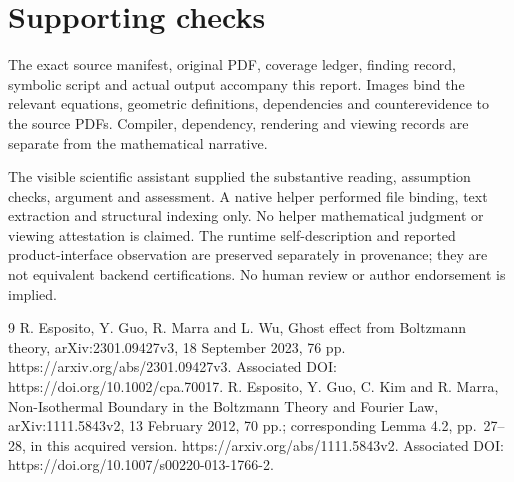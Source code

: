 \documentclass[10pt]{article}
\begin{document}
\section*{Supporting checks}
The exact source manifest, original PDF, coverage ledger, finding record, symbolic script and actual output accompany this report. Images bind the relevant equations, geometric definitions, dependencies and counterevidence to the source PDFs. Compiler, dependency, rendering and viewing records are separate from the mathematical narrative.\par
The visible scientific assistant supplied the substantive reading, assumption checks, argument and assessment. A native helper performed file binding, text extraction and structural indexing only. No helper mathematical judgment or viewing attestation is claimed. The runtime self-description and reported product-interface observation are preserved separately in provenance; they are not equivalent backend certifications. No human review or author endorsement is implied.\par
9 R. Esposito, Y. Guo, R. Marra and L. Wu, Ghost effect from Boltzmann theory, arXiv:2301.09427v3, 18 September 2023, 76 pp. https://arxiv.org/abs/2301.09427v3. Associated DOI: https://doi.org/10.1002/cpa.70017. R. Esposito, Y. Guo, C. Kim and R. Marra, Non-Isothermal Boundary in the Boltzmann Theory and Fourier Law, arXiv:1111.5843v2, 13 February 2012, 70 pp.; corresponding Lemma 4.2, pp. 27–28, in this acquired version. https://arxiv.org/abs/1111.5843v2. Associated DOI: https://doi.org/10.1007/s00220-013-1766-2.\par
\end{document}
